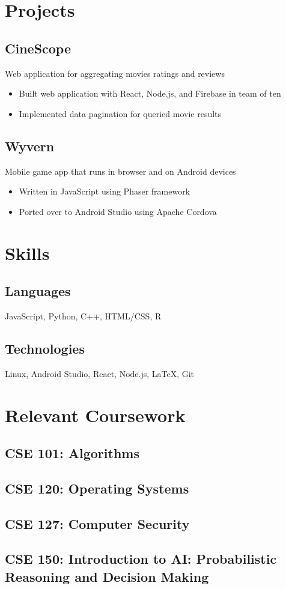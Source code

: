 \documentclass{article}
\begin{document}
\begin{paracol}{2}
\section{Projects}
\subsection{CineScope} \hfill

Web application for aggregating movies ratings and reviews
\begin{itemize}
\item Built web application with React, Node.js, and Firebase in team of ten
\item Implemented data pagination for queried movie results
\end{itemize}

\subsection{Wyvern} \hfill

Mobile game app that runs in browser and on Android devices
\begin{itemize}
\item Written in JavaScript using Phaser framework
\item Ported over to Android Studio using Apache Cordova
\end{itemize}
\switchcolumn
\section{Skills}
\subsection{Languages} \hfill
	
	JavaScript, Python, C++, HTML/CSS, R
	
\subsection{Technologies} \hfill

	Linux, Android Studio, React, Node.js, LaTeX, Git
\section{Relevant Coursework}
\subsection{CSE 101: Algorithms} \hfill
\subsection{CSE 120: Operating Systems} \hfill
\subsection{CSE 127: Computer Security} \hfill
\subsection{CSE 150: Introduction to AI: Probabilistic Reasoning and Decision Making} \hfill
\end{paracol}
\end{document}
